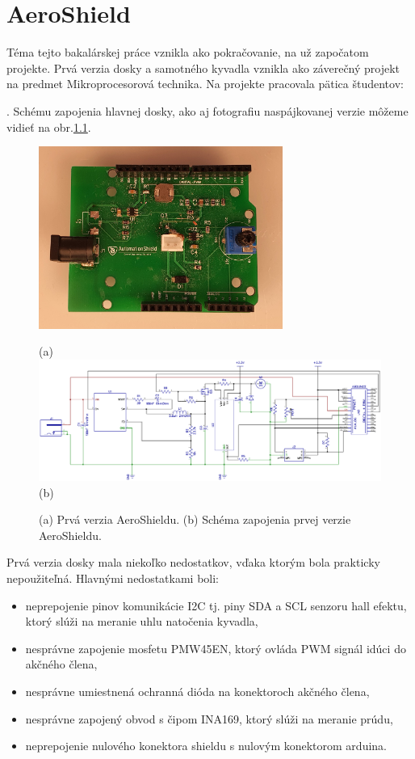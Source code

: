 \chapter{AeroShield}

Téma tejto bakalárskej práce vznikla ako pokračovanie, na už započatom projekte. Prvá verzia dosky a samotného kyvadla vznikla ako záverečný projekt na predmet Mikroprocesorová technika. Na projekte pracovala pätica študentov: 

. Schému zapojenia hlavnej dosky, ako aj fotografiu naspájkovanej verzie môžeme vidieť na obr.\ref{OBRAZOK 2.1.1}.


\begin{figure}[!tbh]
	\centering
	\includegraphics[width=80mm]{obr/oldshield.jpg}
	
	(a)
	\includegraphics[width=\linewidth]{obr/oldshieldscheme.png}
	(b)
	\caption{(a) Prvá verzia AeroShieldu. (b) Schéma zapojenia prvej verzie AeroShieldu.}
	\label{OBRAZOK 2.1.1}
\end{figure}

\vspace{3cm}

Prvá verzia dosky mala niekoľko nedostatkov, vďaka ktorým bola prakticky nepoužiteľná. Hlavnými nedostatkami boli:

\begin{itemize}
	\item neprepojenie pinov komunikácie I2C tj. piny SDA a SCL senzoru hall efektu, ktorý slúži na meranie uhlu natočenia kyvadla,
	\item nesprávne zapojenie mosfetu PMW45EN, ktorý ovláda PWM signál idúci do akčného člena,
	\item nesprávne umiestnená ochranná dióda na konektoroch akčného člena,
	\item nesprávne zapojený obvod s čipom INA169, ktorý slúži na meranie prúdu,
	\item neprepojenie nulového konektora shieldu s nulovým konektorom arduina.
\end{itemize}

